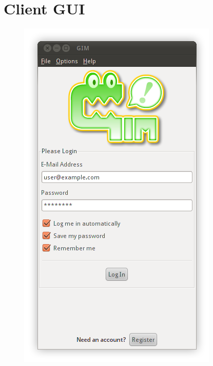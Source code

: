 \section{Client GUI}

\begin{figure}
    \begin{center}
        \includegraphics[scale=0.6]{Implementation/diagrams/login.png}

\end{center}
\end{figure}

